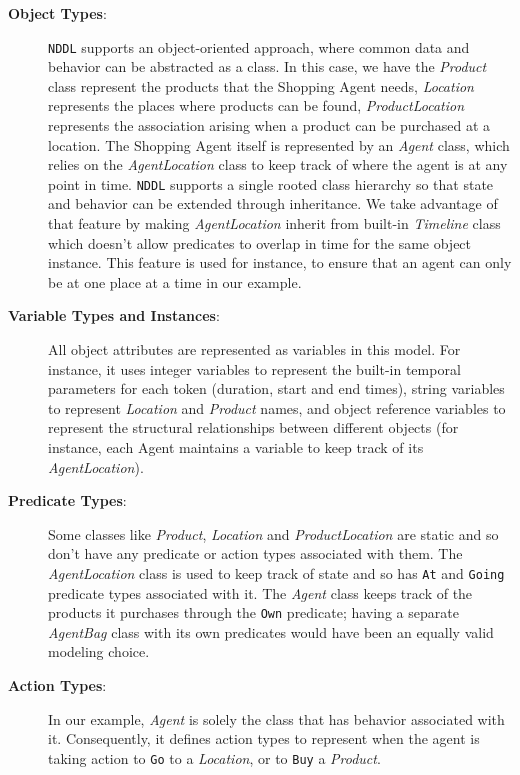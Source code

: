 \begin{description}

\item[\textbf{Object Types}:] \texttt{NDDL} supports an object-oriented
  approach, where common data and behavior can be abstracted as a
  class. In this case, we have the \textit{Product} class represent
  the products that the Shopping Agent needs, \textit{Location}
  represents the places where products can be found,
  \textit{ProductLocation} represents the association arising when a
  product can be purchased at a location. The Shopping Agent itself is
  represented by an \textit{Agent} class, which relies on the
  \textit{AgentLocation} class to keep track of where the agent is at
  any point in time. \texttt{NDDL} supports a single rooted class
  hierarchy so that state and behavior can be extended through
  inheritance. We take advantage of that feature by making
  \textit{AgentLocation} inherit from \eus built-in \textit{Timeline}
  class which doesn't allow predicates to overlap in time for the same
  object instance. This feature is used for instance, to ensure that
  an agent can only be at one place at a time in our example.

\item[\textbf{Variable Types and Instances}:] All object attributes
  are represented as variables in this model. For instance, it uses
  integer variables to represent the built-in temporal parameters for
  each token (duration, start and end times), string
  variables to represent \textit{Location} and \textit{Product} names,
  and object reference variables to represent the structural
  relationships between different objects (for instance, each Agent
  maintains a variable to keep track of its \textit{AgentLocation}).

\item[\textbf{Predicate Types}:] Some classes like \textit{Product},
  \textit{Location} and \textit{ProductLocation} are static and so
  don't have any predicate or action types associated with them. The
  \textit{AgentLocation} class is used to keep track of state and so
  has \texttt{At} and \texttt{Going} predicate types associated with
  it. The \textit{Agent} class keeps track of the products it
  purchases through the \texttt{Own} predicate; having a separate
  \textit{AgentBag} class with its own predicates would have been an
  equally valid modeling choice.

\item[\textbf{Action Types}:] In our example, \textit{Agent} is solely
  the class that has behavior associated with it. Consequently, it
  defines action types to represent when the agent is taking action to
  \texttt{Go} to a \textit{Location}, or to \texttt{Buy} a
  \textit{Product}. 
  
\end{description}

